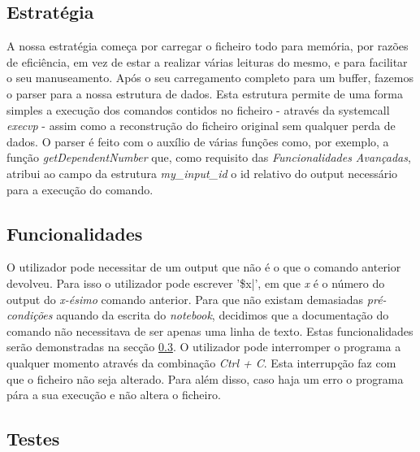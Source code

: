 \documentclass[a4paper]{article}
\begin{document}
\subsection{Estratégia}

A nossa estratégia começa por carregar o ficheiro todo para memória, por razões de eficiência, em vez de estar a realizar várias leituras do mesmo, 
e para facilitar o seu manuseamento. Após o seu carregamento completo para um buffer, fazemos o parser para a nossa estrutura de dados. 
Esta estrutura permite de uma forma simples a execução dos comandos contidos no ficheiro - através da systemcall \textit{execvp} - assim como a reconstrução 
do ficheiro original sem qualquer perda de dados. O parser é feito com o auxílio de várias funções como, por exemplo, a função \textit{getDependentNumber} 
que, como requisito das \textit{Funcionalidades Avançadas}, atribui ao campo da estrutura \textit{my\_input\_id} o id relativo do output necessário para a 
execução do comando.






\subsection{Funcionalidades}
\label{sec:funcionalidades}

O utilizador pode necessitar de um output que não é o que o comando anterior devolveu. Para isso o utilizador pode escrever '\$x|', em que \textit{x} é o
número do output do \textit{x-ésimo} comando anterior. 
Para que não existam demasiadas \textit{pré-condições} aquando da escrita do \textit{notebook}, decidimos que a documentação do comando não necessitava
de ser apenas uma linha de texto.
Estas funcionalidades serão demonstradas na secção \ref{sec:testes}.
O utilizador pode interromper o programa a qualquer momento através da combinação \textit{Ctrl + C}. Esta interrupção faz com que o ficheiro não seja alterado.
Para além disso, caso haja um erro o programa pára a sua execução e não altera o ficheiro.




\subsection{Testes}
\label{sec:testes}
\end{document}
